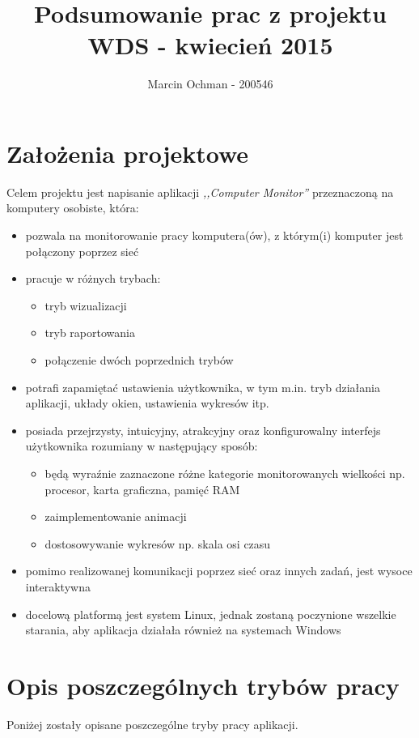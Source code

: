 \documentclass[a4paper]{article}
\title{\textbf{Podsumowanie prac z projektu WDS - kwiecień 2015}}
\author{Marcin Ochman - 200546}
\date{}
\begin{document}


\newpage

\tableofcontents
\listoffigures
\listoftables

\newpage

	\section{Założenia projektowe}
		Celem projektu jest napisanie aplikacji \textit{,,Computer Monitor''} przeznaczoną na komputery osobiste, która:
	\begin{itemize}
		\item pozwala na monitorowanie pracy komputera(ów), z którym(i) komputer jest połączony poprzez sieć
		\item pracuje w różnych trybach:
		\begin{itemize}
			\item tryb wizualizacji
			\item tryb raportowania
			\item połączenie dwóch poprzednich trybów
		\end{itemize}
		\item potrafi zapamiętać ustawienia użytkownika, w tym m.in. tryb działania aplikacji, układy okien, ustawienia wykresów itp.
		\item posiada przejrzysty, intuicyjny, atrakcyjny oraz konfigurowalny interfejs użytkownika rozumiany w następujący sposób:
		\begin{itemize}
			\item będą wyraźnie zaznaczone różne kategorie monitorowanych wielkości np. procesor, karta graficzna, pamięć \uppercase{ram}
			\item zaimplementowanie animacji
			\item dostosowywanie wykresów np. skala osi czasu
			 
		\end{itemize}
		\item pomimo realizowanej komunikacji poprzez sieć oraz innych zadań, jest wysoce 
		interaktywna
		\item docelową platformą jest system Linux, jednak zostaną poczynione wszelkie starania, aby aplikacja działała również na systemach Windows
	\end{itemize}
	
	\section{Opis poszczególnych trybów pracy}
	Poniżej zostały opisane poszczególne tryby pracy aplikacji.
	
\end{document}
